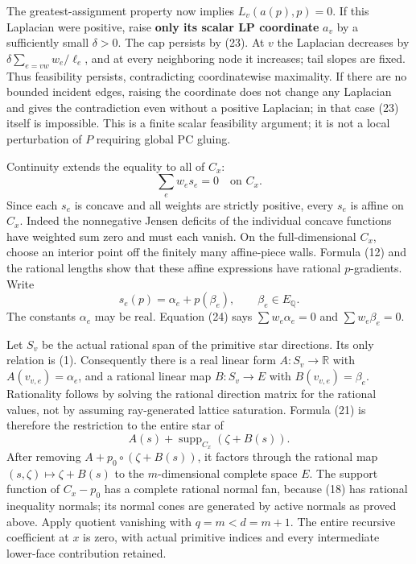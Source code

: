 \documentclass[
  11pt,
]{article}
\begin{document}
The greatest-assignment property now implies \(L_v(a(p),p)=0\). If this
Laplacian were positive, raise \textbf{only its scalar LP coordinate}
\(a_v\) by a sufficiently small \(\delta>0\). The cap persists by (23).
At \(v\) the Laplacian decreases by \(\delta\sum_{e=vw}w_e/\ell_e\), and
at every neighboring node it increases; tail slopes are fixed. Thus
feasibility persists, contradicting coordinatewise maximality. If there
are no bounded incident edges, raising the coordinate does not change
any Laplacian and gives the contradiction even without a positive
Laplacian; in that case (23) itself is impossible. This is a finite
scalar feasibility argument; it is not a local perturbation of \(P\)
requiring global PC gluing.

Continuity extends the equality to all of \(C_x\): \[
                              \sum_e w_es_e=0\quad\text{on }C_x.           \tag{24}
\] Since each \(s_e\) is concave and all weights are strictly positive,
every \(s_e\) is affine on \(C_x\). Indeed the nonnegative Jensen
deficits of the individual concave functions have weighted sum zero and
must each vanish. On the full-dimensional \(C_x\), choose an interior
point off the finitely many affine-piece walls. Formula (12) and the
rational lengths show that these affine expressions have rational
\(p\)-gradients. Write \[
                    s_e(p)=\alpha_e+p(\beta_e),\qquad\beta_e\in E_\mathbb Q.
                                                                         \tag{25}
\] The constants \(\alpha_e\) may be real. Equation (24) says
\(\sum w_e\alpha_e=0\) and \(\sum w_e\beta_e=0\).

Let \(S_v\) be the actual rational span of the primitive star
directions. Its only relation is (1). Consequently there is a real
linear form \(A:S_v\to\mathbb R\) with \(A(v_{v,e})=\alpha_e\), and a
rational linear map \(B:S_v\to E\) with \(B(v_{v,e})=\beta_e\).
Rationality follows by solving the rational direction matrix for the
rational values, not by assuming ray-generated lattice saturation.
Formula (21) is therefore the restriction to the entire star of \[
                       A(s)+\operatorname{supp}_{C_x}(\zeta+B(s)).        \tag{26}
\] After removing \(A+p_0\circ(\zeta+B(s))\), it factors through the
rational map \((s,\zeta)\mapsto\zeta+B(s)\) to the \(m\)-dimensional
complete space \(E\). The support function of \(C_x-p_0\) has a complete
rational normal fan, because (18) has rational inequality normals; its
normal cones are generated by active normals as proved above. Apply
quotient vanishing with \(q=m<d=m+1\). The entire recursive coefficient
at \(x\) is zero, with actual primitive indices and every intermediate
lower-face contribution retained.
\end{document}
